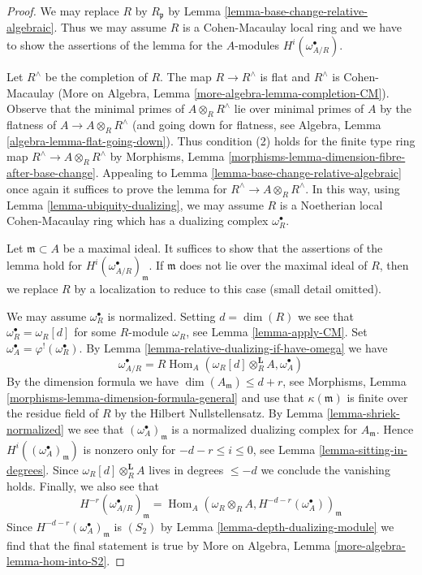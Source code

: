 \documentclass[10pt,a4paper]{amsart}
\theoremstyle{plain}
\theoremstyle{definition}
\theoremstyle{remark}
\numberwithin{equation}{subsection}
\def\Hom{\mathop{\mathrm{Hom}}\nolimits}
\begin{document}
\begin{proof}
We may replace $R$ by $R_\mathfrak p$ by
Lemma \ref{lemma-base-change-relative-algebraic}.
Thus we may assume $R$ is a Cohen-Macaulay local ring
and we have to show the assertions of the lemma
for the $A$-modules $H^i(\omega_{A/R}^\bullet)$.

\medskip\noindent
Let $R^\wedge$ be the completion of $R$.
The map $R \to R^\wedge$ is flat and $R^\wedge$ is Cohen-Macaulay
(More on Algebra, Lemma \ref{more-algebra-lemma-completion-CM}).
Observe that the minimal primes of $A \otimes_R R^\wedge$
lie over minimal primes of $A$ by the flatness of
$A \to A \otimes_R R^\wedge$ (and going down for flatness, see
Algebra, Lemma \ref{algebra-lemma-flat-going-down}).
Thus condition (2) holds for the finite type ring map
$R^\wedge \to A \otimes_R R^\wedge$ by
Morphisms, Lemma \ref{morphisms-lemma-dimension-fibre-after-base-change}.
Appealing to Lemma \ref{lemma-base-change-relative-algebraic}
once again it suffices to prove the lemma for
$R^\wedge \to A \otimes_R R^\wedge$. In this way, using
Lemma \ref{lemma-ubiquity-dualizing},
we may assume $R$ is a Noetherian local
Cohen-Macaulay ring which has a dualizing complex $\omega_R^\bullet$.

\medskip\noindent
Let $\mathfrak m \subset A$ be a maximal ideal.
It suffices to show that the assertions of
the lemma hold for $H^i(\omega_{A/R}^\bullet)_\mathfrak m$.
If $\mathfrak m$ does not lie over the maximal ideal of $R$,
then we replace $R$ by a localization to reduce to this case
(small detail omitted). 

\medskip\noindent
We may assume $\omega_R^\bullet$ is normalized.
Setting $d = \dim(R)$ we see that $\omega_R^\bullet = \omega_R[d]$
for some $R$-module $\omega_R$, see
Lemma \ref{lemma-apply-CM}. Set
$\omega_A^\bullet = \varphi^!(\omega_R^\bullet)$.
By Lemma \ref{lemma-relative-dualizing-if-have-omega} we have
$$
\omega_{A/R}^\bullet =
R\Hom_A(\omega_R[d] \otimes_R^\mathbf{L} A, \omega_A^\bullet)
$$
By the dimension formula we have $\dim(A_\mathfrak m) \leq d + r$, see
Morphisms, Lemma \ref{morphisms-lemma-dimension-formula-general}
and use that $\kappa(\mathfrak m)$ is finite over the residue field of $R$
by the Hilbert Nullstellensatz.
By Lemma \ref{lemma-shriek-normalized}
we see that $(\omega_A^\bullet)_\mathfrak m$
is a normalized dualizing complex for $A_\mathfrak m$.
Hence $H^i((\omega_A^\bullet)_\mathfrak m)$ is nonzero
only for $-d - r \leq i \leq 0$, see
Lemma \ref{lemma-sitting-in-degrees}.
Since $\omega_R[d] \otimes_R^\mathbf{L} A$ lives in
degrees $\leq -d$ we conclude the vanishing holds.
Finally, we also see that
$$
H^{-r}(\omega_{A/R}^\bullet)_\mathfrak m =
\Hom_A(\omega_R \otimes_R A, H^{-d - r}(\omega_A^\bullet))_\mathfrak m
$$
Since $H^{-d - r}(\omega_A^\bullet)_\mathfrak m$ is $(S_2)$ by
Lemma \ref{lemma-depth-dualizing-module}
we find that the final statement is true by
More on Algebra, Lemma \ref{more-algebra-lemma-hom-into-S2}.
\end{proof}
\end{document}

